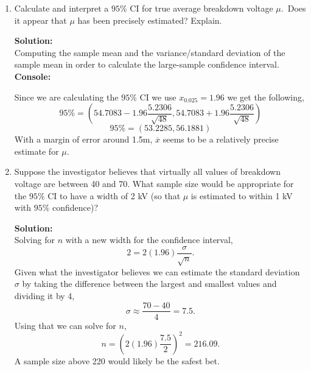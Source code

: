 \documentclass[12pt]{article}
\makeatletter
\theoremstyle{homework}
\newenvironment{exercise}[1]
{\def\@currentlabel{#1}\exercisecore}
{\endexercisecore}
\newcommand{\localhead}[1]{\par\smallskip\noindent\textbf{#1}\nobreak\\}%
\newcommand\solution{\localhead{Solution:}}
\makeatother
\begin{document}
\begin{exercise}{7.16}
\begin{enumerate}
  \item Calculate  and  interpret  a  $95\%$  CI  for  true  average  breakdown voltage $\mu$.\
   Does it appear that $\mu$ has been precisely estimated? Explain.\\
   \solution Computing the sample mean and the variance/standard deviation of the sample mean in order to calculate the 
   large-sample confidence interval.
   \textbf{Console:}
   \begin{center}
   
   \end{center}
   Since we are calculating the $95\%$ CI we use $x_{0.025} = 1.96$ we get the following,
   \begin{equation*}
    95\% = (54.7083 - 1.96 \dfrac{5.2306}{\sqrt{48}}, 54.7083 + 1.96 \dfrac{5.2306}{\sqrt{48}})
   \end{equation*}
   \begin{equation*}
    95\% = (53.2285, 56.1881)
   \end{equation*}
   With a margin of error around 1.5m, $\overline{x}$ seems to be a relatively precise estimate for $\mu$.
   \vspace{.25in}



\item  Suppose  the  investigator  believes  that  virtually  all  values of breakdown voltage are between 
40 and 70. What sample size would be appropriate for the 
$95\%$ CI to have a width of 2 kV (so that $\mu$ is estimated to within 1 kV with $95\%$ confidence)?\\
\solution Solving for $n$ with a new width for the confidence interval,
\begin{equation*}
  2 = 2(1.96) \dfrac{\sigma}{\sqrt{n}}.
\end{equation*}
Given what the investigator believes we can estimate the standard deviation $\sigma$ by taking the difference 
between the largest and smallest values and dividing it by 4,
\begin{equation*}
  \sigma \approx \dfrac{70-40}{4} = 7.5.
\end{equation*}
Using that we can solve for $n$,
\begin{equation*}
  n = (2(1.96) \dfrac{7.5}{2})^2 = 216.09.
\end{equation*}
A sample size above 220 would likely be the safest bet. 
  \end{enumerate}
\end{exercise}
\vspace{.5in}
\end{document}
